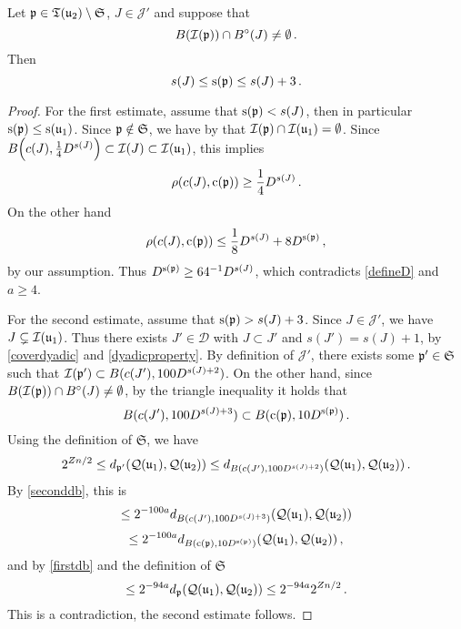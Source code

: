     \begin{lemma}
        \label{limited-scale-impact}
        \leanok
        Let ${\mathfrak p} \in {\mathfrak T}({\mathfrak u}_2) \setminus \mathfrak{S}$, $J \in \mathcal{J}'$ and suppose that
        $$
           B({\mathcal{I}}({\mathfrak p})) \cap B^\circ(J) \ne \emptyset\,.
        $$
        Then
        $$
            s(J) \le {\mathrm{s}}({\mathfrak p}) \le s(J) +3\,.
        $$
    \end{lemma}

    \begin{proof}
        \leanok
        For the first estimate, assume that ${\mathrm{s}}({\mathfrak p}) < s(J)$, then in particular ${\mathrm{s}}({\mathfrak p}) \le {\mathrm{s}}({\mathfrak u}_1)$. Since ${\mathfrak p} \notin \mathfrak{S}$, we have by  that ${\mathcal{I}}({\mathfrak p}) \cap {\mathcal{I}}({\mathfrak u}_1) = \emptyset$.
        Since $B\Big(c(J), \frac{1}{4} D^{s(J)}\Big) \subset {\mathcal{I}}(J) \subset {\mathcal{I}}({\mathfrak u}_1)$, this implies
        $$
            \rho(c(J), {\mathrm{c}}({\mathfrak p})) \ge \frac{1}{4}D^{s(J)}\,.
        $$
        On the other hand
        $$
            \rho(c(J), {\mathrm{c}}({\mathfrak p})) \le \frac{1}{8} D^{s(J)} + 8 D^{{\mathrm{s}}({\mathfrak p})}\,,
        $$
        by our assumption. Thus $D^{{\mathrm{s}}({\mathfrak p})} \ge 64^{-1} D^{s(J)}$, which contradicts \eqref{defineD} and $a \ge 4$.

        For the second estimate, assume that ${\mathrm{s}}({\mathfrak p}) > s(J) + 3$. Since $J \in \mathcal{J}'$, we have $J \subsetneq {\mathcal{I}}({\mathfrak u}_1)$. Thus there exists $J' \in \mathcal{D}$ with $J \subset J'$ and $s(J') = s(J) + 1$, by \eqref{coverdyadic} and \eqref{dyadicproperty}. By definition of $\mathcal{J}'$, there exists some ${\mathfrak p}' \in \mathfrak{S}$ such that ${\mathcal{I}}({\mathfrak p}') \subset B(c(J'), 100 D^{s(J) + 2})$. On the other hand, since $B({\mathcal{I}}({\mathfrak p})) \cap B^\circ(J) \ne \emptyset$, by the triangle inequality it holds that
        $$
            B(c(J'), 100 D^{s(J) + 3}) \subset B({\mathrm{c}}({\mathfrak p}), 10 D^{{\mathrm{s}}({\mathfrak p})})\,.
        $$
        Using the definition of $\mathfrak{S}$, we have
        $$
            2^{Zn/2} \le d_{{\mathfrak p}'}({\mathcal{Q}}({\mathfrak u}_1), {\mathcal{Q}}({\mathfrak u}_2)) \le d_{B(c(J'), 100 D^{s(J) + 2})}({\mathcal{Q}}({\mathfrak u}_1), {\mathcal{Q}}({\mathfrak u}_2))\,.
        $$
        By \eqref{seconddb}, this is
        $$
            \le 2^{-100a} d_{B(c(J'), 100 D^{s(J) + 3})}({\mathcal{Q}}({\mathfrak u}_1), {\mathcal{Q}}({\mathfrak u}_2))
        $$
        $$
            \le 2^{-100a} d_{B({\mathrm{c}}({\mathfrak p}), 10 D^{{\mathrm{s}}({\mathfrak p})})}({\mathcal{Q}}({\mathfrak u}_1), {\mathcal{Q}}({\mathfrak u}_2))\,,
        $$
        and by \eqref{firstdb} and the definition of $\mathfrak{S}$
        $$
            \le 2^{-94a} d_{{\mathfrak p}}({\mathcal{Q}}({\mathfrak u}_1), {\mathcal{Q}}({\mathfrak u}_2)) \le 2^{-94a} 2^{Zn/2}\,.
        $$
        This is a contradiction, the second estimate follows.
    \end{proof}


